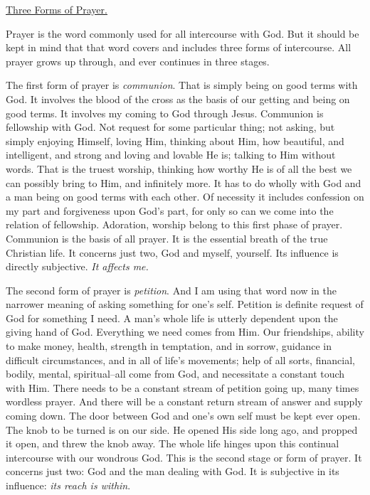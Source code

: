 \underline{Three Forms of Prayer.}


Prayer is the word commonly used for all intercourse with God. But it
should be kept in mind that that word covers and includes three forms of
intercourse. All prayer grows up through, and ever continues in three
stages.

The first form of prayer is \textit{communion}. That is simply being on good
terms with God. It involves the blood of the cross as the basis of our
getting and being on good terms. It involves my coming to God through
Jesus. Communion is fellowship with God. Not request for some particular
thing; not asking, but simply enjoying Himself, loving Him, thinking about
Him, how beautiful, and intelligent, and strong and loving and lovable He
is; talking to Him without words. That is the truest worship, thinking how
worthy He is of all the best we can possibly bring to Him, and infinitely
more. It has to do wholly with God and a man being on good terms with each
other. Of necessity it includes confession on my part and forgiveness upon
God's part, for only so can we come into the relation of fellowship.
Adoration, worship belong to this first phase of prayer. Communion is the
basis of all prayer. It is the essential breath of the true Christian
life. It concerns just two, God and myself, yourself. Its influence is
directly subjective. \textit{It affects me.}

The second form of prayer is \textit{petition}. And I am using that word now in
the narrower meaning of asking something for one's self. Petition is
definite request of God for something I need. A man's whole life is
utterly dependent upon the giving hand of God. Everything we need comes
from Him. Our friendships, ability to make money, health, strength in
temptation, and in sorrow, guidance in difficult circumstances, and in all
of life's movements; help of all sorts, financial, bodily, mental,
spiritual--all come from God, and necessitate a constant touch with Him.
There needs to be a constant stream of petition going up, many times
wordless prayer. And there will be a constant return stream of answer and
supply coming down. The door between God and one's own self must be kept
ever open. The knob to be turned is on our side. He opened His side long
ago, and propped it open, and threw the knob away. The whole life hinges
upon this continual intercourse with our wondrous God. This is the second
stage or form of prayer. It concerns just two: God and the man dealing
with God. It is subjective in its influence: \textit{its reach is within}.

